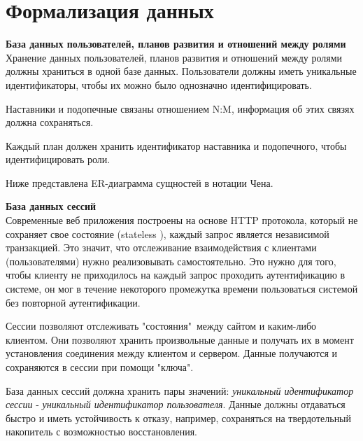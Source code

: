 %


\newpage
\section{Формализация данных}

\noindent\textbf{База данных пользователей, планов развития и отношений между ролями}\\
Хранение данных пользователей, планов развития и отношений между ролями должны храниться в одной базе данных.
Пользователи должны иметь уникальные идентификаторы, чтобы их можно было однозначно идентифицировать.

Наставники и подопечные связаны отношением N:M, информация об этих связях должна сохраняться.

Каждый план должен хранить идентификатор наставника и подопечного, чтобы идентифицировать роли.

Ниже представлена ER-диаграмма сущностей в нотации Чена.

\newpage

\noindent\textbf{База данных сессий}\\
Современные веб приложения построены на основе HTTP протокола, который не сохраняет свое состояние (stateless \cite{stateful-stateless}), каждый запрос
является независимой транзакцией.
Это значит, что отслеживание взаимодействия с клиентами (пользователями) нужно реализовывать самостоятельно.
Это нужно для того, чтобы клиенту не приходилось на каждый запрос проходить аутентификацию в системе, он мог в течение некоторого промежутка
времени пользоваться системой без повторной аутентификации.

Сессии \cite{sessions} позволяют отслеживать "состояния"\  между сайтом и каким-либо клиентом.
Они позволяют хранить произвольные данные и получать их в момент установления соединения между клиентом и сервером.
Данные получаются и сохраняются в сессии при помощи "ключа".

База данных сессий должна хранить пары значений: \textit{уникальный идентификатор сессии} - \textit{уникальный идентификатор пользователя}.
Данные должны отдаваться быстро и иметь устойчивость к отказу, например, сохраняться на твердотельный накопитель с возможностью восстановления.

